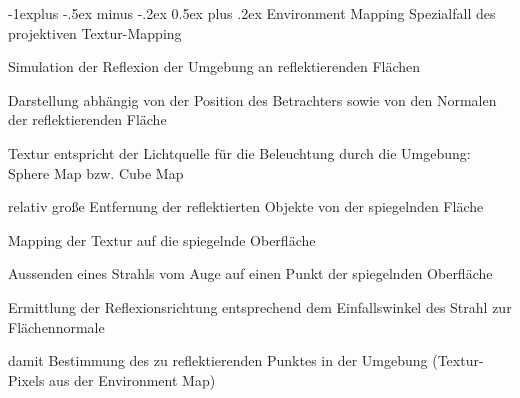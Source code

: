 \documentclass[landscape]{article}
\makeatletter
\renewcommand{\subsection}{\@startsection{subsection}{2}{0mm}%
                                {-1explus -.5ex minus -.2ex}%
                                {0.5ex plus .2ex}%
                                {\normalfont\normalsize\bfseries}}
\makeatother
\begin{document}
\begin{multicols}{3}
  \subsection{Environment Mapping}
  Spezialfall des projektiven Textur-Mapping
  \begin{itemize*}
    \item Simulation der Reflexion der Umgebung an reflektierenden Flächen
    \item Darstellung abhängig von der Position des Betrachters sowie von den Normalen der reflektierenden Fläche
    \item Textur entspricht der Lichtquelle für die Beleuchtung durch die Umgebung: Sphere Map bzw. Cube Map
    \item relativ große Entfernung der reflektierten Objekte von der spiegelnden Fläche
  \end{itemize*}
  
  Mapping der Textur auf die spiegelnde Oberfläche
  \begin{itemize*}
    \item Aussenden eines Strahls vom Auge auf einen Punkt der spiegelnden Oberfläche
    \item Ermittlung der Reflexionsrichtung entsprechend dem Einfallswinkel des Strahl zur Flächennormale
    \item damit Bestimmung des zu reflektierenden Punktes in der Umgebung (Textur-Pixels aus der Environment Map)
  \end{itemize*}
  

\end{multicols}
\end{document}
